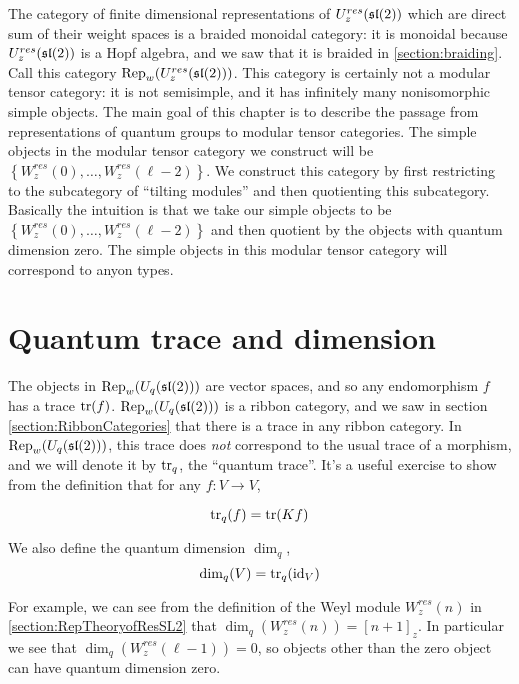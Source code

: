 \label{chapter:MTC}
The category of finite dimensional representations of $U_z^{res}(\mathfrak{sl}(2))$
which are direct sum of their weight spaces is a braided monoidal category: it
is monoidal because $U_z^{res}(\mathfrak{sl}(2))$ is a Hopf algebra, and we saw that it
is braided in \ref{section:braiding}. Call this category
$\operatorname{Rep}_w(U_z^{res}(\mathfrak{sl}(2)))$. This category is certainly not a modular tensor
category: it is not semisimple, and it has infinitely many nonisomorphic simple
objects. The main goal of this chapter is to describe the passage from
representations of quantum groups to modular tensor categories.  The simple
objects in the modular tensor category we construct will be $\left\{
W_z^{res}(0), \ldots, W_z^{res}(\ell-2) \right\}$. We construct this category
by first restricting to the subcategory of ``tilting modules'' and then
quotienting this subcategory. Basically the intuition is that we take our
simple objects to be $\left\{ W_z^{res}(0), \ldots, W_z^{res}(\ell-2) \right\}$
and then quotient by the objects with quantum dimension zero.  The simple
objects in this modular tensor category will correspond to anyon types.



\section{Quantum trace and dimension}

The objects in $\operatorname{Rep}_w(U_q(\mathfrak{sl}(2)))$ are vector spaces, and so any
endomorphism $f$ has a trace $\operatorname{tr}(f)$. $\operatorname{Rep}_w(U_q(\mathfrak{sl}(2)))$ is a ribbon
category, and we saw in section \ref{section:RibbonCategories} that there is a
trace in any ribbon category. In $\operatorname{Rep}_w(U_q(\mathfrak{sl}(2)))$, this trace does
\emph{not} correspond to the usual trace of a morphism, and we will denote it
by $\operatorname{tr}_q$, the ``quantum trace''. It's a useful exercise to show from the
definition that for any $f: V \to V$,

\begin{equation}
\operatorname{tr}_q(f) = \operatorname{tr}(Kf)
\end{equation}

We also define the quantum dimension $\dim_q$,
\begin{equation}
\dim_q(V) = \operatorname{tr}_q(\operatorname{id}_V)
\end{equation}

For example, we can see from the definition of the Weyl module $W_z^{res}(n)$
in \ref{section:RepTheoryofResSL2} that $\dim_q(W_z^{res}(n)) = [n+1]_z$. In
particular we see that $\dim_q(W_z^{res}(\ell - 1)) = 0$, so objects other than
the zero object can have quantum dimension zero. 

